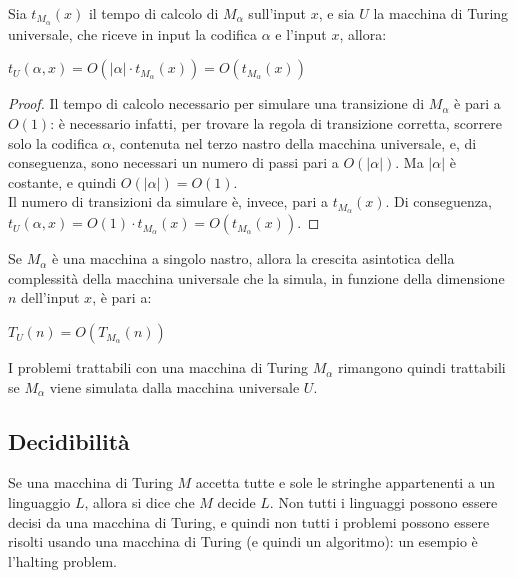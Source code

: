 \begin{thm}
    Sia $t_{M_{\alpha}} (x)$ il tempo di calcolo di $M_{\alpha}$ sull'input $x$, e sia $U$ la macchina di Turing universale, che riceve in input la codifica $\alpha$ e l'input $x$, allora:
    \begin{center}
        $t_U (\alpha, x) = O \left( |\alpha| \cdot t_{M_{\alpha}} (x) \right) = O \left( t_{M_{\alpha}} (x) \right)$
    \end{center}
\end{thm}

\begin{proof}
    Il tempo di calcolo necessario per simulare una transizione di $M_{\alpha}$ è pari a $O(1)$: è necessario infatti, per trovare la regola di transizione corretta, scorrere solo la codifica $\alpha$, contenuta nel terzo nastro della macchina universale, e, di conseguenza, sono necessari un numero di passi pari a $O(|\alpha|)$. Ma $|\alpha|$ è costante, e quindi $O(|\alpha|) = O(1)$.\\
    Il numero di transizioni da simulare è, invece, pari a $t_{M_{\alpha}} (x)$.
    Di conseguenza, $t_U (\alpha, x) = O(1) \cdot t_{M_{\alpha}} (x) = O \left( t_{M_{\alpha}} (x) \right)$.
\end{proof}

\begin{rem}
    Se $M_{\alpha}$ è una macchina a singolo nastro, allora la crescita asintotica della complessità della macchina universale che la simula, in funzione della dimensione $n$ dell'input $x$, è pari a:
    \begin{center}
        $T_U (n) = O \left( T_{M_{\alpha}} (n) \right)$
    \end{center}
    I problemi trattabili con una macchina di Turing $M_{\alpha}$ rimangono quindi trattabili se $M_{\alpha}$ viene simulata dalla macchina universale $U$.
\end{rem}

\subsection*{Decidibilità}
Se una macchina di Turing $M$ accetta tutte e sole le stringhe appartenenti a un linguaggio $L$, allora si dice che $M$ decide $L$.
Non tutti i linguaggi possono essere decisi da una macchina di Turing, e quindi non tutti i problemi possono essere risolti usando una macchina di Turing (e quindi un algoritmo): un esempio è l'halting problem.

